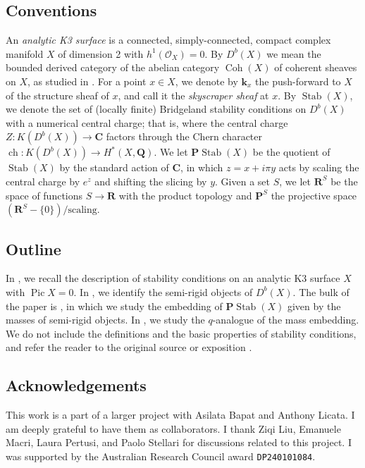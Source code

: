 \documentclass{amsart}
\begin{document}
\subsection{Conventions}
An \emph{analytic K3 surface} is a connected, simply-connected, compact complex manifold \(X\) of dimension 2 with \(h^1(\mathcal{O}_X) = 0\).
By \(D^b(X)\) we mean the bounded derived category of the abelian category \(\operatorname{Coh}(X)\) of coherent sheaves on \(X\), as studied in \cite{huy.mac.ste:08}.
For a point \(x \in X\), we denote by \(\mathbf{k}_x\) the push-forward to \(X\) of the structure sheaf of \(x\), and call it the \emph{skyscraper sheaf} at \(x\).
By \(\operatorname{Stab}(X)\), we denote the set of (locally finite) Bridgeland stability conditions on \(D^b(X)\) with a numerical central charge; that is, where the central charge \(Z \colon K(D^b(X)) \to \mathbf{C}\) factors through the Chern character \(\operatorname{ch} \colon K(D^b(X)) \to H^{*}(X, \mathbf{Q})\).
We let \(\mathbf{P} \operatorname{Stab}(X)\) be the quotient of \(\operatorname{Stab}(X)\) by the standard action of \(\mathbf{C}\), in which \(z = x + i\pi y\) acts by scaling the central charge by \(e^{z}\) and shifting the slicing by \(y\).
Given a set \(S\), we let \(\mathbf{R}^S\) be the space of functions \(S \to \mathbf{R}\) with the product topology and \(\mathbf{P}^S\) the projective space \(\left(\mathbf{R}^S - \{0\}\right) / \text{scaling}\).
\subsection{Outline}
In , we recall the description of stability conditions on an analytic K3 surface \(X\) with \(\operatorname{Pic} X = 0\).
In , we identify the semi-rigid objects of \(D^b(X)\).
The bulk of the paper is , in which we study the embedding of \(\mathbf{P} \operatorname{Stab}(X)\) given by the masses of semi-rigid objects.
In , we study the \(q\)-analogue of the mass embedding.
We do not include the definitions and the basic properties of stability conditions, and refer the reader to the original source \cite{bri:07} or exposition \cite{bay:11}.

\subsection{Acknowledgements}
This work is a part of a larger project with Asilata Bapat and Anthony Licata.
I am deeply grateful to have them as collaborators.
I thank Ziqi Liu, Emanuele Macri, Laura Pertusi, and Paolo Stellari for discussions related to this project.
I was supported by the Australian Research Council award \texttt{DP240101084}.
\end{document}
